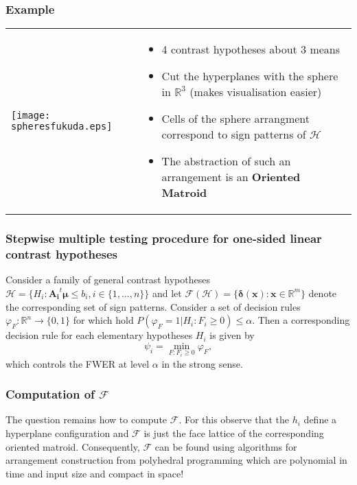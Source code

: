 \documentclass[bigger]{beamer}
\newcommand{\bs}[1]{\bm{#1}}
\newcommand{\R}{\mathbb{R}}
\providecommand{\alert}[1]{\textbf{#1}}
\begin{document}
\begin{frame}
  \frametitle{Example}

\begin{tabular}{ll}
  \begin{minipage}{.4\textwidth}
  \texttt{[image: spheresfukuda.eps]}
  \end{minipage} &
  \begin{minipage}{.6\textwidth}
    \begin{itemize}
    \item 4 contrast hypotheses about 3 means
    \item Cut the hyperplanes with the sphere in $\R^3$ (makes
      visualisation easier)
    \item Cells of the sphere arrangment correspond to sign patterns
      of $\mathscr{H}$
    \item The abstraction of such an arrangement is an \alert{Oriented Matroid}
    \end{itemize}
  \end{minipage}
\end{tabular}

\end{frame}

\begin{frame}
  \frametitle{Stepwise multiple testing procedure for one-sided linear
    contrast hypotheses}

  Consider a family of general contrast hypotheses $\mathscr{H} =
  \{H_i: \bs{A_i}^t\bs{\mu} \leq b_i,i \in \{1,...,n\}\}$ and let
  $\mathscr{F}(\mathscr{H}) = \{ \bs{\delta}(\bs{x}): \bs{x} \in
  \R^m\}$ denote the corresponding set of sign patterns. Consider a
  set of decision rules $\varphi_F: \R^n \rightarrow \{0,1\}$ for
  which hold $P(\varphi_F = 1 | H_i: F_i \geq 0) \leq \alpha$. Then a
  corresponding decision rule for each elementary hypotheses $H_i$ is
  given by 
  \begin{equation}
    \label{eq:signtest}
    \psi_i = \min_{F: F_i \geq 0} \varphi_F,
  \end{equation}
  which controls the FWER at level $\alpha$ in the strong sense. 


\end{frame}


\begin{frame}
  \frametitle{Computation of $\mathscr{F}$}
  The question remains how to compute $\mathcal{F}$. For this observe
that the $h_i$ define a hyperplane configuration and $\mathcal{F}$ is
just the face lattice of the corresponding oriented
matroid. Consequently, $\mathcal{F}$ can be found using algorithms
for arrangement construction from polyhedral programming
\cite{Avis-KF-92,Avis-KF-96,Ferrez-KF-Liebling-01} which are
polynomial in time and input size and compact in space!

\end{frame}
\end{document}
